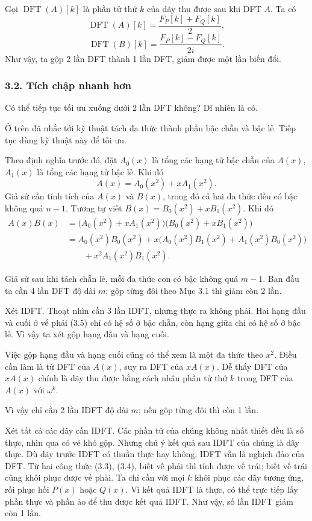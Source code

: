 \documentclass[11pt]{article}
\begin{document}
Gọi \(\operatorname{DFT}(A)[k]\) là phần tử thứ \(k\) của dãy thu được sau khi
DFT \(A\). Ta có
\[
  \operatorname{DFT}(A)[k]=\frac{F_P[k]+F_Q[k]}{2}, \tag{3.3}
\]
\[
  \operatorname{DFT}(B)[k]=\frac{F_P[k]-F_Q[k]}{2i}. \tag{3.4}
\]
Như vậy, ta gộp 2 lần DFT thành 1 lần DFT, giảm được một lần biến đổi.

\subsubsection*{3.2. Tích chập nhanh hơn}

Có thể tiếp tục tối ưu xuống dưới 2 lần DFT không? Dĩ nhiên là có.

Ở trên đã nhắc tới kỹ thuật tách đa thức thành phần bậc chẵn và bậc lẻ. Tiếp
tục dùng kỹ thuật này để tối ưu.

Theo định nghĩa trước đó, đặt \(A_0(x)\) là tổng các hạng tử bậc chẵn của
\(A(x)\), \(A_1(x)\) là tổng các hạng tử bậc lẻ. Khi đó
\[
  A(x)=A_0(x^2)+xA_1(x^2).
\]
Giả sử cần tính tích của \(A(x)\) và \(B(x)\), trong đó cả hai đa thức đều có
bậc không quá \(n-1\). Tương tự viết \(B(x)=B_0(x^2)+xB_1(x^2)\). Khi đó
\begin{align*}
A(x)B(x)
  &= \bigl(A_0(x^2)+xA_1(x^2)\bigr)
     \bigl(B_0(x^2)+xB_1(x^2)\bigr)\\
  &= A_0(x^2)B_0(x^2)
     +x\bigl(A_0(x^2)B_1(x^2)+A_1(x^2)B_0(x^2)\bigr)\\
  &\qquad +x^2A_1(x^2)B_1(x^2). \tag{3.5}
\end{align*}

Giả sử sau khi tách chẵn lẻ, mỗi đa thức con có bậc không quá \(m-1\). Ban đầu
ta cần 4 lần DFT độ dài \(m\); gộp từng đôi theo Mục 3.1 thì giảm còn 2 lần.

Xét IDFT. Thoạt nhìn cần 3 lần IDFT, nhưng thực ra không phải. Hai hạng đầu và
cuối ở vế phải (3.5) chỉ có hệ số ở bậc chẵn, còn hạng giữa chỉ có hệ số ở
bậc lẻ. Vì vậy ta xét gộp hạng đầu và hạng cuối.

Việc gộp hạng đầu và hạng cuối cũng có thể xem là một đa thức theo \(x^2\).
Điều cần làm là từ DFT của \(A(x)\), suy ra DFT của \(xA(x)\). Dễ thấy DFT của
\(xA(x)\) chính là dãy thu được bằng cách nhân phần tử thứ \(k\) trong DFT của
\(A(x)\) với \(\omega^k\).

Vì vậy chỉ cần 2 lần IDFT độ dài \(m\); nếu gộp từng đôi thì còn 1 lần.

Xét tất cả các dãy cần IDFT. Các phần tử của chúng không nhất thiết đều là số
thực, nhìn qua có vẻ khó gộp. Nhưng chú ý kết quả sau IDFT của chúng là dãy
thực. Dù dãy trước IDFT có thuần thực hay không, IDFT vẫn là nghịch đảo của
DFT. Từ hai công thức (3.3), (3.4), biết vế phải thì tính được vế trái; biết
vế trái cũng khôi phục được vế phải. Ta chỉ cần với mọi \(k\) khôi phục các
dãy tương ứng, rồi phục hồi \(P(x)\) hoặc \(Q(x)\). Vì kết quả IDFT là thực,
có thể trực tiếp lấy phần thực và phần ảo để thu được kết quả IDFT. Như vậy,
số lần IDFT giảm còn 1 lần.
\end{document}
